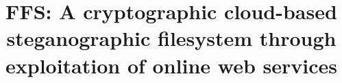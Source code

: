\title{FFS: A cryptographic cloud-based steganographic filesystem through exploitation of online web services}